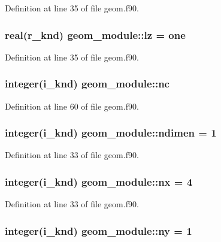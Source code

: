Definition at line 35 of file geom.\-f90.

\hypertarget{classgeom__module_aba080d6dd2b57ad40676a7331daaa824}{
\subsubsection[{lz}]{\setlength{\rightskip}{0pt plus 5cm}real(r\-\_\-knd) geom\-\_\-module\-::lz = one}}\label{classgeom__module_aba080d6dd2b57ad40676a7331daaa824}


Definition at line 35 of file geom.\-f90.

\hypertarget{classgeom__module_af92dc09eacd9c240bd51ea2792a13820}{
\subsubsection[{nc}]{\setlength{\rightskip}{0pt plus 5cm}integer(i\-\_\-knd) geom\-\_\-module\-::nc}}\label{classgeom__module_af92dc09eacd9c240bd51ea2792a13820}


Definition at line 60 of file geom.\-f90.

\hypertarget{classgeom__module_a764bf4ab4dc187512c803d73505e6b57}{
\subsubsection[{ndimen}]{\setlength{\rightskip}{0pt plus 5cm}integer(i\-\_\-knd) geom\-\_\-module\-::ndimen = 1}}\label{classgeom__module_a764bf4ab4dc187512c803d73505e6b57}


Definition at line 33 of file geom.\-f90.

\hypertarget{classgeom__module_a7a5902416f1d33e2a27620d6c82db061}{
\subsubsection[{nx}]{\setlength{\rightskip}{0pt plus 5cm}integer(i\-\_\-knd) geom\-\_\-module\-::nx = 4}}\label{classgeom__module_a7a5902416f1d33e2a27620d6c82db061}


Definition at line 33 of file geom.\-f90.

\hypertarget{classgeom__module_a38b87580d41ec11b8719f65f06b8b0a3}{
\subsubsection[{ny}]{\setlength{\rightskip}{0pt plus 5cm}integer(i\-\_\-knd) geom\-\_\-module\-::ny = 1}}\label{classgeom__module_a38b87580d41ec11b8719f65f06b8b0a3}



